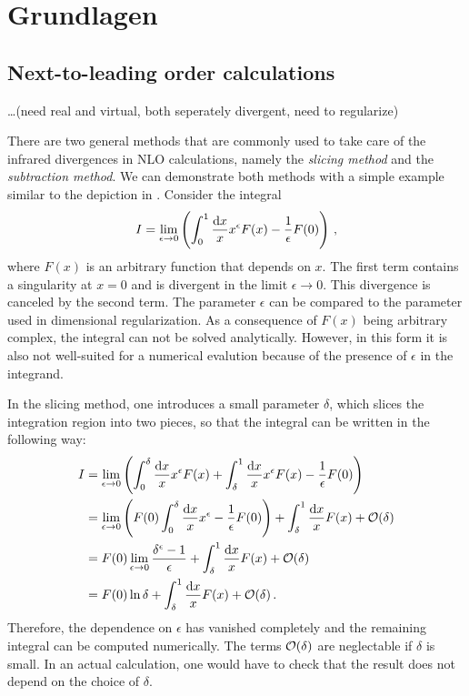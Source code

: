 
\chapter{Grundlagen}
\section{Next-to-leading order calculations}
\label{sec:nlo_calculations}
\ldots(need real and virtual, both seperately divergent, need to regularize)


There are two general methods that are commonly used to take care of the infrared divergences in NLO calculations, namely the \textit{slicing method} and the \textit{subtraction method}.
We can demonstrate both methods with a simple example similar to the depiction in \cite{slicing_vs_subtraction}.
Consider the integral
%
\begin{equation}
	I = \lim_{\epsilon \rightarrow 0} \left( \int_0^1 \frac{\dif x}{x} x^\epsilon F(x) - \frac{1}{\epsilon} F(0) \right) \, ,
\end{equation}
%
where $F(x)$ is an arbitrary function that depends on $x$.
The first term contains a singularity at $x=0$ and is divergent in the limit $\epsilon \rightarrow 0$.
This divergence is canceled by the second term.
The parameter $\epsilon$ can be compared to the parameter used in dimensional regularization.
As a consequence of $F(x)$ being arbitrary complex, the integral can not be solved analytically.
However, in this form it is also not well-suited for a numerical evalution because of the presence of $\epsilon$ in the integrand.

In the slicing method, one introduces a small parameter $\delta$, which slices the integration region into two pieces, so that the integral can be written in the following way:
%
\begin{align}
	I 	&= \lim_{\epsilon \rightarrow 0} \left( \int_0^\delta \frac{\dif x}{x} x^\epsilon F(x) + \int_\delta^1 \frac{\dif x}{x} x^\epsilon F(x) - \frac{1}{\epsilon} F(0) \right) \nonumber \\
		&= \lim_{\epsilon \rightarrow 0} \left( F(0) \int_0^\delta \frac{\dif x}{x} x^\epsilon - \frac{1}{\epsilon} F(0) \right) + \int_\delta^1 \frac{\dif x}{x} F(x) + \order{\delta} \nonumber \\
		&= F(0) \lim_{\epsilon \rightarrow 0} \frac{\delta^\epsilon - 1}{\epsilon} + \int_\delta^1 \frac{\dif x}{x} F(x) + \order{\delta} \nonumber \\
		&= F(0) \ln \delta + \int_\delta^1 \frac{\dif x}{x} F(x) + \order{\delta} \, .
\end{align}
%
Therefore, the dependence on $\epsilon$ has vanished completely and the remaining integral can be computed numerically.
The terms $\operatorname{\mathcal{O}}(\delta)$ are neglectable if $\delta$ is small.
In an actual calculation, one would have to check that the result does not depend on the choice of $\delta$.

